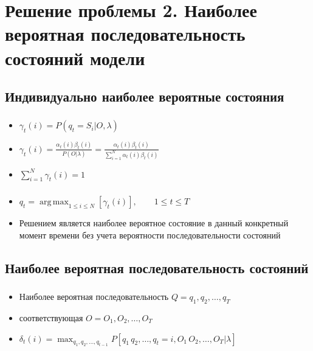\documentclass{beamer}
\DeclareMathOperator*{\argmax}{arg\,max}
\begin{document}
\section{Решение проблемы 2. Наиболее вероятная последовательность состояний модели}
\subsection{Индивидуально наиболее вероятные состояния}

\begin{frame}
  \frametitle{\insertsection}
  \framesubtitle{\insertsubsection}
  
  \begin{itemize}
  \item $\displaystyle \gamma_t(i) = P(q_t = S_i | O, \lambda)$ \pause
  \item $\displaystyle \gamma_t(i) = \frac{\alpha_t(i) \beta_t(i)}{P(O | \lambda)} = \frac{\alpha_t(i) \beta_t(i)}{\sum_{i = 1}^{N} \alpha_t(i) \beta_t(i)}$
    \pause
  \item $\displaystyle \sum_{i = 1}^N \gamma_t(i) = 1$
  \end{itemize}

\end{frame}

\begin{frame}
  \frametitle{\insertsection}
  \framesubtitle{\insertsubsection}
  
  \begin{itemize}
  \item $\displaystyle q_t = \argmax_{1 \le i \le N}{[\gamma_t(i)]}, \qquad 1 \le t \le T$
    \item Решением является наиболее вероятное состояние в \alert{данный конкретный момент времени} без учета вероятности \alert{последовательности состояний}
  \end{itemize}

\end{frame}

\subsection{Наиболее вероятная последовательность состояний}
\begin{frame}
  \frametitle{\insertsection}
  \framesubtitle{\insertsubsection}
  
  \begin{itemize}
  \item Наиболее вероятная последовательность $\displaystyle Q = q_1, q_2, \ldots, q_T$ \pause
  \item соответствующая $O = O_1, O_2, \ldots, O_T$
  \item $\displaystyle \delta_t(i) = \max_{q_1, q_2, \ldots, q_{t - 1}}{P[q_1\, q_2, \ldots, q_t = i, O_1\, O_2, \ldots, O_T|\lambda]}$
  \end{itemize}

\end{frame}
\end{document}
